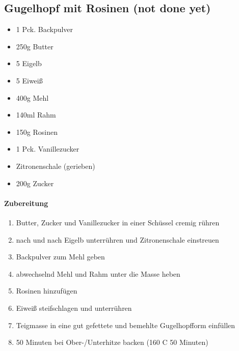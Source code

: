 \newpage
\subsection{Gugelhopf mit Rosinen (not done yet)}
\begin{itemize}[noitemsep]
	\item 1 Pck. Backpulver
	\item 250g Butter
	\item 5 Eigelb
	\item 5 Eiweiß
	\item 400g Mehl
	\item 140ml Rahm
	\item 150g Rosinen
	\item 1 Pck. Vanillezucker
	\item Zitronenschale (gerieben)
	\item 200g Zucker
\end{itemize}
\paragraph{Zubereitung}
\begin{enumerate}[noitemsep]
	\item Butter, Zucker und Vanillezucker in einer Schüssel cremig rühren
	\item nach und nach Eigelb unterrühren und Zitronenschale einstreuen
	\item Backpulver zum Mehl geben 
	\item abwechselnd Mehl und Rahm unter die Masse heben
	\item Rosinen hinzufügen 
	\item Eiweiß steifschlagen und unterrühren
	\item Teigmasse in eine gut gefettete und bemehlte Gugelhopfform einfüllen
	\item 50 Minuten bei Ober-/Unterhitze backen (160 \textdegree C 50 Minuten)
\end{enumerate}
